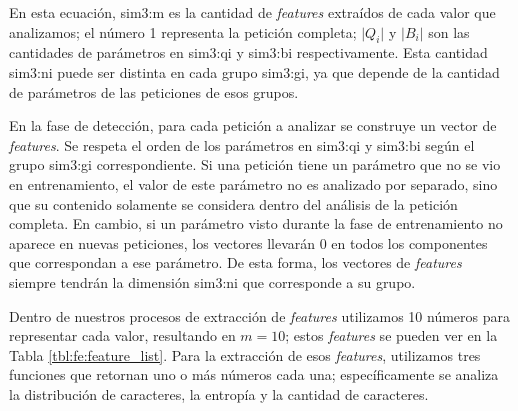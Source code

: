 En esta ecuación, \gls{sim3:m} es la cantidad de \textit{features}
extraídos de cada valor que analizamos; el número 1 representa la petición
completa; $\lvert Q_{i} \rvert$ y $\lvert B_{i} \rvert$ son las cantidades
de parámetros en \gls{sim3:qi} y \gls{sim3:bi} respectivamente. Esta
cantidad \gls{sim3:ni} puede ser distinta en cada grupo
\gls{sim3:gi}, ya que depende de la cantidad de parámetros de
las peticiones de esos grupos.

En la fase de detección, para cada petición a analizar se construye un
vector de \textit{features}. Se respeta el orden
de los parámetros en \gls{sim3:qi} y \gls{sim3:bi} según el grupo
\gls{sim3:gi} correspondiente. Si una petición tiene
un parámetro que no se vio en entrenamiento, el valor de este parámetro
no es analizado por separado, sino que su contenido solamente se considera
dentro del análisis de la petición completa.
En cambio, si un parámetro visto durante la fase de entrenamiento no
aparece en nuevas peticiones, los vectores llevarán
0 en todos los componentes que correspondan a ese parámetro.
De esta forma, los vectores de \textit{features} siempre tendrán la
dimensión \gls{sim3:ni} que corresponde a su grupo.

Dentro de nuestros procesos de extracción de \textit{features} utilizamos
10 números para representar cada valor, resultando en $m = 10$; estos
\textit{features} se pueden ver en la Tabla \ref{tbl:fe:feature_list}.
Para la extracción de esos \textit{features}, utilizamos
tres funciones que retornan uno o más números cada una; específicamente
se analiza la distribución de caracteres, la entropía y la cantidad de
caracteres.


